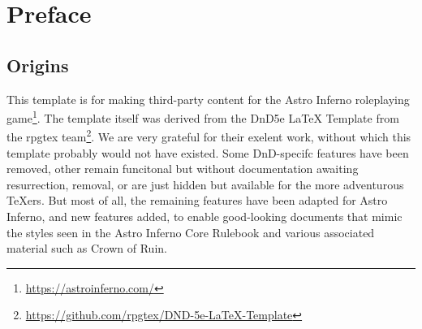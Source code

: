 \documentclass[letterpaper,twocolumn,openany,nodeprecatedcode]{astroinfernobook}
\begin{document}
\frontmatter

\begin{titlepage}

\end{titlepage}

\AIMakeElementTOCpage

\mainmatter

\chapter*{Preface} \label{ch:preface}
\section{Origins}
\noindent
This template is for making third-party content for the Astro Inferno roleplaying game\footnote
{\url{https://astroinferno.com/}}. The template itself was derived
from the DnD5e LaTeX Template from the rpgtex
team\footnote{\url{https://github.com/rpgtex/DND-5e-LaTeX-Template}}. We are very
grateful for their exelent work, without which this template probably
would not have existed. Some DnD-specifc features have been removed,
other remain funcitonal but without documentation awaiting
resurrection, removal, or are just hidden but available for the more
adventurous TeXers. But most of all, the remaining features have been adapted
for Astro Inferno, and new features added, to enable
good-looking documents that mimic the styles seen in the Astro Inferno
Core Rulebook and various associated material such as Crown of Ruin.
\end{document}
